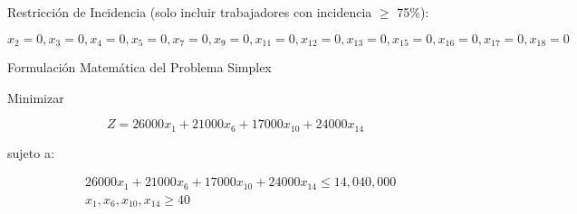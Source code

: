 \documentclass{plantillauft}
\begin{document}
Restricción de Incidencia (solo incluir trabajadores con incidencia $\geq$ 75\%):

\begin{equation*}
x_2 = 0, x_3 = 0, x_4 = 0, x_5 = 0, x_7 = 0, x_9 = 0, x_{11} = 0, x_{12} = 0, x_{13} = 0, x_{15} = 0, x_{16} = 0, x_{17} = 0, x_{18} = 0
\end{equation*}

Formulación Matemática del Problema Simplex

Minimizar

\begin{equation*}
Z = 26000x_1 + 21000x_6 + 17000x_{10} + 24000x_{14}
\end{equation*}

sujeto a:

\begin{align*}
&26000x_1 + 21000x_6 + 17000x_{10} + 24000x_{14} \leq 14,040,000 \\
&x_1, x_6, x_{10}, x_{14} \geq 40
\end{align*}
\end{document}
